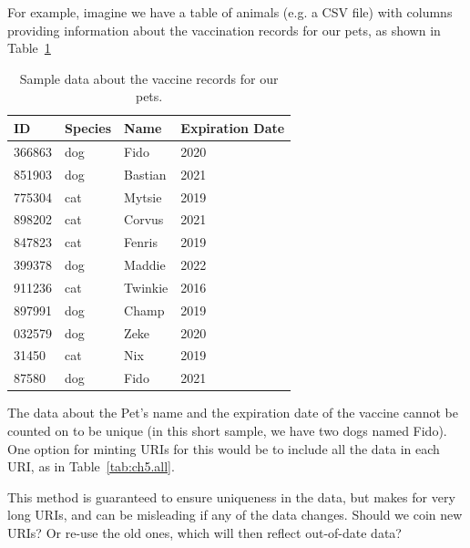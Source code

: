 For example, imagine  we have a table of animals (e.g. a CSV file) with columns
providing information about the vaccination records for our pets, as shown in Table~\ref{tab:ch5.pets}

\begin{table}
    \centering
    \begin{tabular}{|l l l l|}
    \hline
    ID&Species&Name&Expiration Date \\
    \hline\hline
366863&dog&Fido&2020 \\
851903&dog&Bastian&2021 \\
775304&cat&Mytsie&2019 \\
898202&cat&Corvus&2021 \\
847823&cat&Fenris&2019 \\
399378&dog&Maddie&2022 \\
911236&cat&Twinkie&2016 \\
897991&dog&Champ&2019 \\
032579&dog&Zeke&2020 \\
31450&cat&Nix&2019 \\
87580&dog&Fido&2021 \\
\hline
    \end{tabular}
    \caption{Sample data about the vaccine records for our pets. }
    \label{tab:ch5.pets}
\end{table}


The data about the Pet's name and the expiration date of the vaccine cannot be counted on to be  unique
(in this short sample, we have two dogs named Fido).  One option for minting URIs for this would be to include all the data in each URI, as in Table~\ref{tab:ch5.all}.

This method is guaranteed to ensure uniqueness in the data, but makes for very long URIs, and can be misleading if any of the data changes.  Should we coin new URIs?  Or re-use the old ones, which will then reflect out-of-date data?

